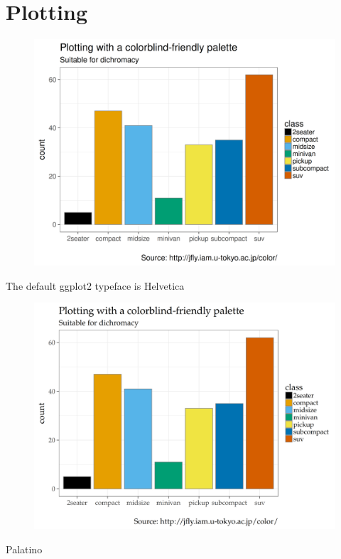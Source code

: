 
\section{Plotting}
\label{sec:plotting}



\begin{frame}
  \begin{figure}[htp!]
    \centering
    \includegraphics[width=0.9\linewidth]{figures/barchart-defaultfont.png}
  \end{figure}

  \small The default ggplot2 typeface is Helvetica
  
\end{frame}


\begin{frame}
  \begin{figure}[htp!]
    \centering
    \includegraphics[width=0.9\linewidth]{figures/barchart-palatino.png}
  \end{figure}
  
  \small Palatino 
  
\end{frame}

